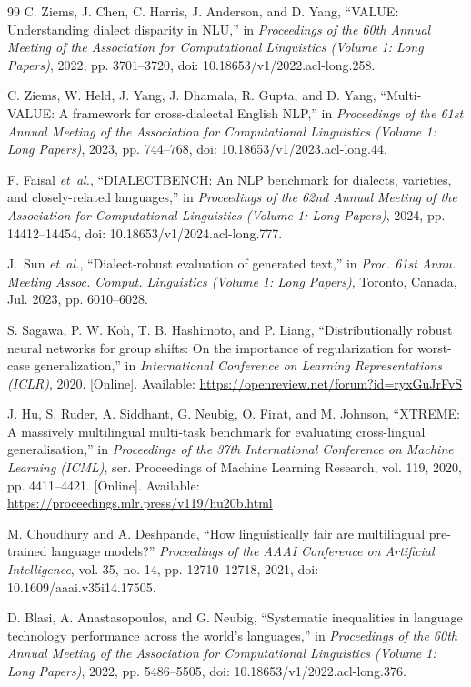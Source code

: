 \begin{thebibliography}{99}
C. Ziems, J. Chen, C. Harris, J. Anderson, and D. Yang, ``{VALUE}: Understanding dialect disparity in {NLU},'' in \emph{Proceedings of the 60th Annual Meeting of the Association for Computational Linguistics (Volume 1: Long Papers)}, 2022, pp. 3701--3720, doi: 10.18653/v1/2022.acl-long.258.

C. Ziems, W. Held, J. Yang, J. Dhamala, R. Gupta, and D. Yang, ``Multi-{VALUE}: A framework for cross-dialectal {E}nglish {NLP},'' in \emph{Proceedings of the 61st Annual Meeting of the Association for Computational Linguistics (Volume 1: Long Papers)}, 2023, pp. 744--768, doi: 10.18653/v1/2023.acl-long.44.

F. Faisal \emph{et~al.}, ``{DIALECTBENCH}: An {NLP} benchmark for dialects, varieties, and closely-related languages,'' in \emph{Proceedings of the 62nd Annual Meeting of the Association for Computational Linguistics (Volume 1: Long Papers)}, 2024, pp. 14412--14454, doi: 10.18653/v1/2024.acl-long.777.

J.~Sun \emph{et~al.}, ``Dialect-robust evaluation of generated text,'' in \emph{Proc. 61st Annu. Meeting Assoc. Comput. Linguistics (Volume 1: Long Papers)}, Toronto, Canada, Jul. 2023, pp. 6010--6028.

S. Sagawa, P. W. Koh, T. B. Hashimoto, and P. Liang, ``Distributionally robust neural networks for group shifts: On the importance of regularization for worst-case generalization,'' in \emph{International Conference on Learning Representations (ICLR)}, 2020. [Online]. Available: \url{https://openreview.net/forum?id=ryxGuJrFvS}

J. Hu, S. Ruder, A. Siddhant, G. Neubig, O. Firat, and M. Johnson, ``{XTREME}: A massively multilingual multi-task benchmark for evaluating cross-lingual generalisation,'' in \emph{Proceedings of the 37th International Conference on Machine Learning (ICML)}, ser. Proceedings of Machine Learning Research, vol. 119, 2020, pp. 4411--4421. [Online]. Available: \url{https://proceedings.mlr.press/v119/hu20b.html}

M. Choudhury and A. Deshpande, ``How linguistically fair are multilingual pre-trained language models?'' \emph{Proceedings of the AAAI Conference on Artificial Intelligence}, vol. 35, no. 14, pp. 12710--12718, 2021, doi: 10.1609/aaai.v35i14.17505.

D. Blasi, A. Anastasopoulos, and G. Neubig, ``Systematic inequalities in language technology performance across the world's languages,'' in \emph{Proceedings of the 60th Annual Meeting of the Association for Computational Linguistics (Volume 1: Long Papers)}, 2022, pp. 5486--5505, doi: 10.18653/v1/2022.acl-long.376.


\end{thebibliography}
